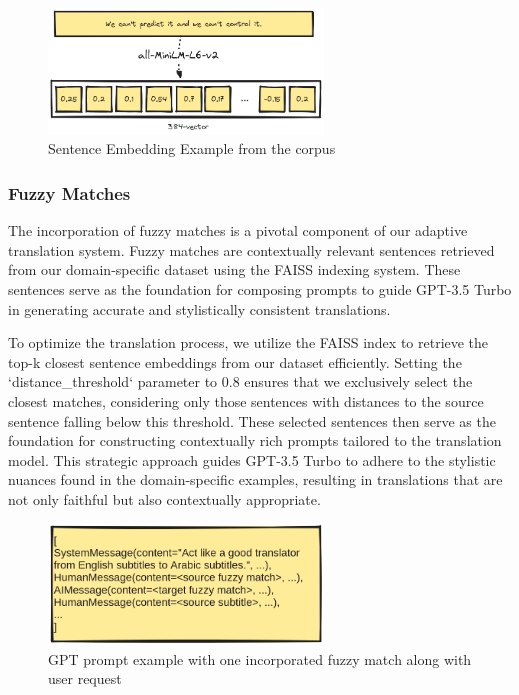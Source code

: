 \documentclass[12pt]{article}
\begin{document}
\begin{figure}[h]
	\centering
	\includegraphics[width=0.65\textwidth]{assets/sentence_embedding.png}
	\caption{Sentence Embedding Example from the corpus}
	\label{fig:sentenceembedding}
\end{figure}



\subsubsection{Fuzzy Matches}

The incorporation of fuzzy matches is a pivotal component of our adaptive translation system. Fuzzy matches are contextually relevant sentences retrieved from our domain-specific dataset using the FAISS indexing system. These sentences serve as the foundation for composing prompts to guide GPT-3.5 Turbo in generating accurate and stylistically consistent translations.

To optimize the translation process, we utilize the FAISS index to retrieve the top-k closest sentence embeddings from our dataset efficiently. Setting the `distance\_threshold` parameter to 0.8 ensures that we exclusively select the closest matches, considering only those sentences with distances to the source sentence falling below this threshold. These selected sentences then serve as the foundation for constructing contextually rich prompts tailored to the translation model. This strategic approach guides GPT-3.5 Turbo to adhere to the stylistic nuances found in the domain-specific examples, resulting in translations that are not only faithful but also contextually appropriate.


\begin{figure}[h]
	\centering
	\includegraphics[width=0.65\textwidth]{assets/prompt_example.png}
	\caption{GPT prompt example with one incorporated fuzzy match along with user request}
	\label{fig:sample}
\end{figure}
\end{document}
